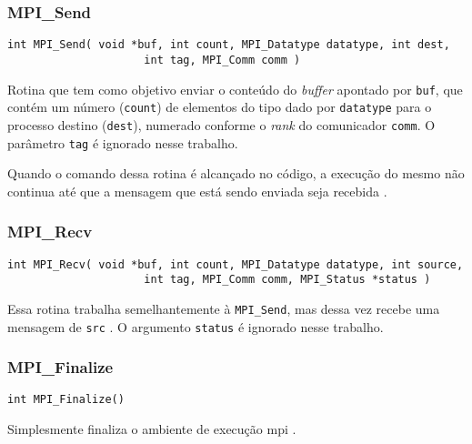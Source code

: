 \subsubsection{MPI\_Send}
\begin{lstlisting}
int MPI_Send( void *buf, int count, MPI_Datatype datatype, int dest,
                     int tag, MPI_Comm comm )
\end{lstlisting}
Rotina que tem como objetivo enviar o conteúdo do \textit{buffer} apontado por 
\texttt{buf}, que contém um número (\texttt{count}) de elementos do tipo dado por 
\texttt{datatype} para o processo destino (\texttt{dest}), numerado conforme o 
\textit{rank} do comunicador \texttt{comm}. O parâmetro \texttt{tag} é ignorado nesse 
trabalho.

Quando o comando dessa rotina é alcançado no código, a execução do mesmo não continua 
até que a mensagem que está sendo enviada seja recebida \cite{man:mpi_send}.
\\
\subsubsection{MPI\_Recv}
\begin{lstlisting}
int MPI_Recv( void *buf, int count, MPI_Datatype datatype, int source,
                     int tag, MPI_Comm comm, MPI_Status *status )
\end{lstlisting}
Essa rotina trabalha semelhantemente à \texttt{MPI\_Send}, mas dessa vez recebe uma mensagem 
de \texttt{src} \cite{man:mpi_recv}. O argumento \texttt{status} é ignorado nesse trabalho.
\\
\subsubsection{MPI\_Finalize}
\begin{lstlisting}
int MPI_Finalize()
\end{lstlisting}
Simplesmente finaliza o ambiente de execução \acrshort{mpi} \cite{man:mpi_finalize}.
